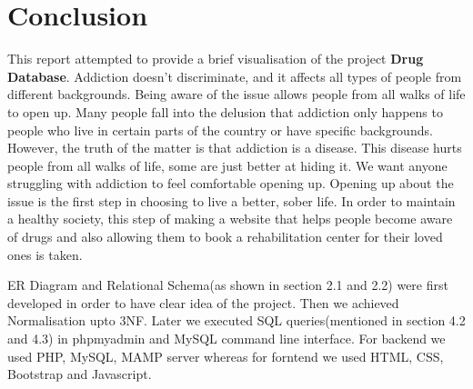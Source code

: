 \documentclass{report}
\begin{document}
\chapter{Conclusion}
This report attempted to provide a brief visualisation of the project \textbf{Drug Database}. Addiction doesn’t discriminate, and it affects all types of people from different backgrounds. Being aware of the issue allows 
people from all walks of life to open up.  Many people fall into the delusion that addiction only happens to people who live in certain parts of the country or have specific backgrounds. However, the truth of the matter is that addiction is a disease. 
This disease hurts people from all walks of life, some are just better at hiding it. We want anyone struggling with addiction to feel comfortable opening up. Opening up about the issue is the first step in choosing to live a better, sober life. In order to maintain a healthy society, this step of making a website that helps people become aware of drugs and also allowing them to book a rehabilitation center for their loved ones is taken.

ER Diagram and Relational Schema(as shown in section 2.1 and 2.2) were first developed in order to have clear idea of the project. Then we achieved Normalisation upto 3NF. Later we executed SQL queries(mentioned in section 4.2 and 4.3)
in phpmyadmin and MySQL command line interface. For backend we used PHP, MySQL, MAMP server whereas for forntend we used HTML, CSS, Bootstrap and Javascript.
\end{document}
